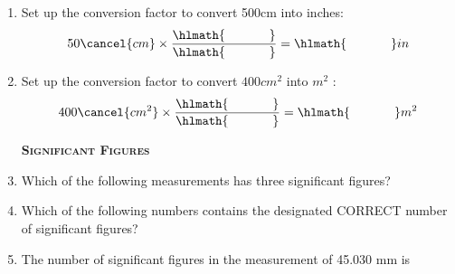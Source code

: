 \documentclass[main.tex]{subfiles}
\begin{document}
\begin{multicols*}{2}
\begin{enumerate}
\item Set up the conversion factor to convert 500cm into inches:
\[50\cancel{cm} \times \dfrac{\hlmath{\hspace{35pt}} }{\hlmath{\hspace{35pt}}}=\hlmath{\hspace{35pt}}in\]

\item Set up the conversion factor to convert $400cm^2$ into $m^2$ :
\[400\cancel{cm^2} \times \dfrac{\hlmath{\hspace{35pt}} }{\hlmath{\hspace{35pt}}}=\hlmath{\hspace{35pt}}m^2\]

{\raggedright\textsc{\textbf{Significant Figures }}\par}


\item Which of the following measurements has three significant figures? 
\begin{enumerate}[label=(\alph*)]
\end{enumerate}

\item Which of the following numbers contains the designated CORRECT number of significant figures?  
\begin{enumerate}[label=(\alph*)]
\end{enumerate}

\item The number of significant figures in the measurement of 45.030 mm is   
\begin{enumerate}[label=(\alph*)]\end{enumerate}


\end{enumerate}
\end{multicols*}
\end{document}
